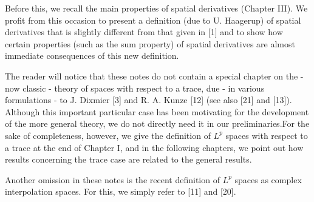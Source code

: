 Before this, we recall the main properties of spatial derivatives (Chapter III). We profit from this occasion to present a definition (due to U. Haagerup) of spatial derivatives that is slightly different from that given in [1] and to show how certain properties (such as the sum property) of spatial derivatives are almost immediate consequences of this new definition.\par
The reader will notice that these notes do not contain a special chapter on the - now classic - theory of spaces with respect to a trace, due - in various formulations - to J. Dixmier [3] and R. A. Kunze [12] (see also [21] and [13]). Although this important particular case has been motivating for the development of the more general theory, we do not directly need it in our preliminaries.For the sake of completeness, however, we give the definition of $L^p$ spaces with respect to a trace at the end of Chapter I, and in the following chapters, we point out how results concerning the trace case are related to the general results.\par
Another omission in these notes is the recent definition of $L^p$ spaces as complex interpolation spaces. For this, we simply refer to [11] and [20].
% 